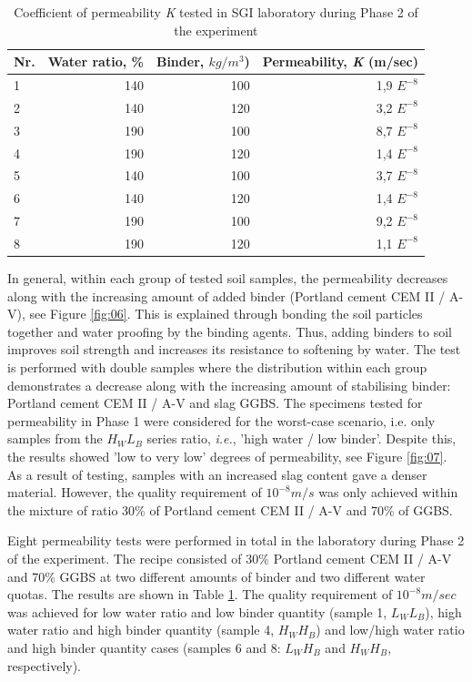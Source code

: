 \documentclass{amestyle}
\begin{document}
\begin{table}[htbp]
  \caption{Coefficient of permeability \emph{K} tested in SGI laboratory during Phase 2 of the experiment}
  \label{tab:1}
  \centering
  \begin{tabular}{| l | r | r | r |}
    \hline
    \multicolumn{1}{|c|}{Nr.} &
    \multicolumn{1}{|c|}{Water ratio, \%} &
    \multicolumn{1}{|c|}{Binder, $kg/m^3$)} &
    \multicolumn{1}{|c|}{Permeability, \emph{K} (m/sec) } \\\hline
    1 & 140 & 100 & 1,9 $E^{-8}$ \\
    2 & 140 & 120 & 3,2 $E^{-8}$ \\
    3 & 190 & 100 & 8,7 $E^{-8}$ \\
    4 & 190 & 120 & 1,4 $E^{-8}$ \\
    5 & 140 & 100 & 3,7 $E^{-8}$ \\
    6 & 140 & 120 & 1,4 $E^{-8}$ \\
    7 & 190 & 100 & 9,2 $E^{-8}$ \\
    8 & 190 & 120 & 1,1 $E^{-8}$ \\\hline
  \end{tabular}
\end{table}

In general, within each group of tested soil samples, the permeability decreases along with the increasing amount of added binder (Portland cement CEM II / A-V), see Figure \ref{fig:06}. This is explained through bonding the soil particles together and water proofing by the binding agents. Thus, adding binders to soil improves soil strength and increases its resistance to softening by water. The test is performed with double samples where the distribution within each group demonstrates a decrease along with the increasing amount of stabilising binder: Portland cement CEM II / A-V and slag GGBS. The specimens tested for permeability in Phase 1 were considered for the worst-case scenario, i.e. only samples from the $H_WL_B$ series ratio, \emph{i.e.}, 'high water / low binder'. Despite this, the results showed 'low to very low' degrees of permeability, see Figure \ref{fig:07}. As a result of testing, samples with an increased slag content gave a denser material. However, the quality requirement of $10^{-8} m/s$ was only achieved within the mixture of ratio 30\% of Portland cement CEM II / A-V and 70\% of GGBS. 

Eight permeability tests were performed in total in the laboratory during Phase 2 of the experiment. The recipe consisted of 30\% Portland cement CEM II / A-V and 70\% GGBS at two different amounts of binder and two different water quotas. The results are shown in Table \ref{tab:1}. The quality requirement of $10^{-8} m/sec$ was achieved for low water ratio and low binder quantity (sample 1, $L_WL_B$), high water ratio and high binder quantity (sample 4, $H_WH_B$) and low/high water ratio and high binder quantity cases (samples 6 and 8: $L_WH_B$ and $H_WH_B$, respectively). 
\end{document}
